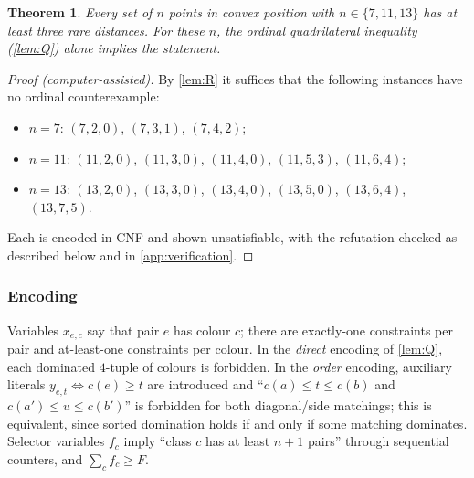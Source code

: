 \documentclass[11pt]{amsart}
\newtheorem{theorem}{Theorem}[section]
\theoremstyle{definition}
\theoremstyle{remark}
\begin{document}
\begin{theorem}\label{thm:1113}
Every set of $n$ points in convex position with $n\in\{7,11,13\}$ has at least three rare distances. For these $n$, the ordinal quadrilateral inequality (\cref{lem:Q}) alone implies the statement.
\end{theorem}
\begin{proof}[Proof (computer-assisted)]
By \cref{lem:R} it suffices that the following instances have no ordinal counterexample:
\begin{itemize}[leftmargin=2em]
\item $n=7$: $(7,2,0)$, $(7,3,1)$, $(7,4,2)$;
\item $n=11$: $(11,2,0)$, $(11,3,0)$, $(11,4,0)$, $(11,5,3)$, $(11,6,4)$;
\item $n=13$: $(13,2,0)$, $(13,3,0)$, $(13,4,0)$, $(13,5,0)$, $(13,6,4)$, $(13,7,5)$.
\end{itemize}
Each is encoded in CNF and shown unsatisfiable, with the refutation checked as described below and in \cref{app:verification}.
\end{proof}

\subsubsection*{Encoding}
Variables $x_{e,c}$ say that pair $e$ has colour $c$; there are exactly-one constraints per pair and at-least-one constraints per colour. In the \emph{direct} encoding of \cref{lem:Q}, each dominated $4$-tuple of colours is forbidden. In the \emph{order} encoding, auxiliary literals $y_{e,t}\Leftrightarrow c(e)\ge t$ are introduced and ``$c(a)\le t\le c(b)$ and $c(a')\le u\le c(b')$'' is forbidden for both diagonal/side matchings; this is equivalent, since sorted domination holds if and only if some matching dominates. Selector variables $f_c$ imply ``class $c$ has at least $n+1$ pairs'' through sequential counters, and $\sum_cf_c\ge F$.
\end{document}
